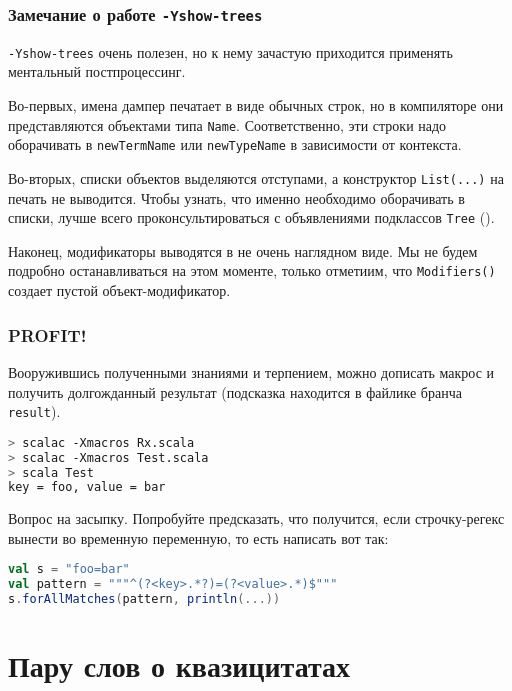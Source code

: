 \documentclass[hyperref={bookmarks=false}]{beamer}
\begin{document}
\begin{frame}[t,fragile]
\frametitle{Замечание о работе \texttt{-Yshow-trees}}

\texttt{-Yshow-trees} очень полезен, но к нему зачастую приходится применять ментальный постпроцессинг.

Во-первых, имена дампер печатает в виде обычных строк, но в компиляторе они представляются объектами типа \texttt{Name}. Соответственно, эти строки надо оборачивать в \texttt{newTermName} или \texttt{newTypeName} в зависимости от контекста.

Во-вторых, списки объектов выделяются отступами, а конструктор \texttt{List(...)} на печать не выводится. Чтобы узнать, что именно необходимо оборачивать в списки, лучше всего проконсультироваться с объявлениями подклассов \texttt{Tree} ().

Наконец, модификаторы выводятся в не очень наглядном виде. Мы не будем подробно останавливаться на этом моменте, только отметиим, что \texttt{Modifiers()} создает пустой объект-модификатор.
\end{frame}

\begin{frame}[t,fragile]
\frametitle{PROFIT!}

Вооружившись полученными знаниями и терпением, можно дописать макрос и получить долгожданный результат (подсказка находится в файлике  бранча \texttt{result}).

\begin{lstlisting}[language=bash]
> scalac -Xmacros Rx.scala
> scalac -Xmacros Test.scala
> scala Test
key = foo, value = bar
\end{lstlisting}

Вопрос на засыпку. Попробуйте предсказать, что получится, если строчку-регекс вынести во временную переменную, то есть написать вот так:

\begin{lstlisting}[language=scala]
val s = "foo=bar"
val pattern = """^(?<key>.*?)=(?<value>.*)$"""
s.forAllMatches(pattern, println(...))
\end{lstlisting}%
\end{frame}

\section{Пару слов о квазицитатах}
\end{document}
